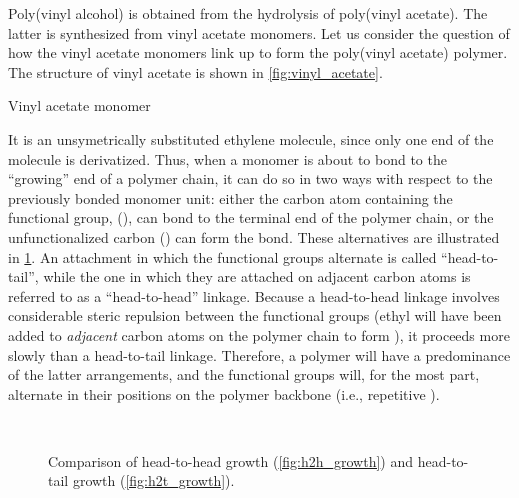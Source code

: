 \documentclass[nobib,nofonts,nols,nohyper]{tufte-handout}
\begin{document}
Poly(vinyl alcohol) is obtained from the hydrolysis of poly(vinyl acetate). 
The latter is synthesized from vinyl acetate monomers. 
Let us consider the question of how the vinyl acetate monomers link up to form the poly(vinyl acetate) polymer. 
The structure of vinyl acetate is shown in \cref{fig:vinyl_acetate}.
\begin{marginfigure}
	\centering
	\caption{Vinyl acetate monomer}
	\label{fig:vinyl_acetate}
\end{marginfigure}
It is an unsymetrically substituted ethylene molecule, since only one end of the molecule is derivatized. 
Thus, when a monomer is about to bond to the ``growing'' end of a polymer chain, it can do so in two ways with respect to the previously bonded monomer unit: either the carbon atom containing the functional group,  (), can bond to the terminal end of the polymer chain, or the unfunctionalized carbon () can form the bond. 
These alternatives are illustrated in \cref{fig:growth_directions}. 
An attachment in which the functional groups alternate is called ``head-to-tail'', while the one in which they are attached on adjacent carbon atoms is referred to as a ``head-to-head'' linkage. 
Because a head-to-head linkage involves considerable steric repulsion between the functional groups (ethyl will have been added to \emph{adjacent} carbon atoms on the polymer chain to form ), it proceeds more slowly than a head-to-tail linkage. 
Therefore, a polymer will have a predominance of the latter arrangements, and the functional groups will, for the most part, alternate in their positions on the polymer backbone (i.e., repetitive ). 
\begin{figure}[htb]
	\captionsetup[subfigure]{farskip=20pt,captionskip=20pt}
	 \\
	\caption{Comparison of head-to-head growth (\cref{fig:h2h_growth}) and head-to-tail growth (\cref{fig:h2t_growth}).}
	\label{fig:growth_directions}
\end{figure}
\end{document}
